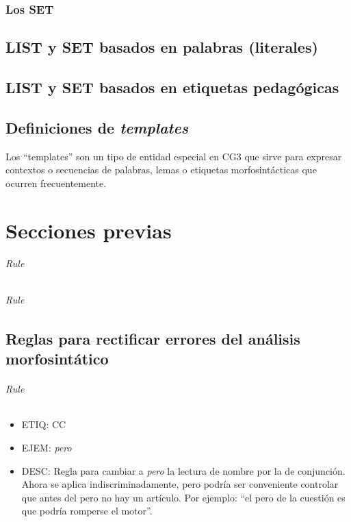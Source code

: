 \documentclass[11pt]{report}
\begin{document}
\section{Los SET}
\chapter{LIST y SET basados en palabras (literales)}
\chapter{LIST y SET basados en etiquetas pedagógicas}
\chapter{Definiciones de \emph{templates}}
Los ``templates'' son un tipo de entidad especial en CG3 que sirve para expresar contextos o secuencias de palabras, lemas o etiquetas morfosintácticas que ocurren frecuentemente. 

\part{Secciones previas}
\paragraph*{Rule}
\paragraph*{Rule}
\chapter{Reglas para rectificar errores del análisis morfosintático}
\paragraph*{Rule}
\begin{itemize}
\item ETIQ: CC
\item EJEM: \emph{pero} 
\item DESC: Regla para cambiar a \emph{pero} la lectura de nombre por la de conjunción. Ahora se aplica indiscriminadamente, pero podría ser conveniente controlar que antes del pero no hay un artículo. Por ejemplo: ``el pero de la cuestión es que podría romperse el motor''.
\end{itemize}
\end{document}
